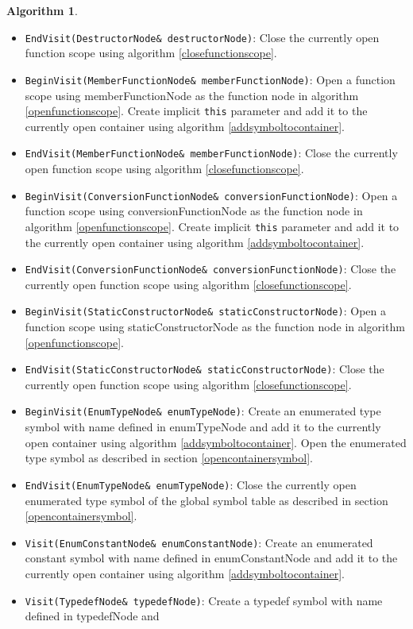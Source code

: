 \documentclass[a4paper,oneside,11pt]{book}
\theoremstyle{definition}
\newtheorem{algo}{Algorithm}[section]
\begin{document}
\begin{algo}
\begin{itemize}
\item
\verb|EndVisit(DestructorNode& destructorNode)|:
Close the currently open function scope using algorithm \ref{closefunctionscope}.
\item
\verb|BeginVisit(MemberFunctionNode& memberFunctionNode)|:
Open a function scope using memberFunctionNode as the function node in algorithm \ref{openfunctionscope}.
Create implicit \verb|this| parameter and add it to the currently open container using algorithm \ref{addsymboltocontainer}.
\item
\verb|EndVisit(MemberFunctionNode& memberFunctionNode)|:
Close the currently open function scope using algorithm \ref{closefunctionscope}.
\item
\verb|BeginVisit(ConversionFunctionNode& conversionFunctionNode)|:
Open a function scope using conversionFunctionNode as the function node in algorithm \ref{openfunctionscope}.
Create implicit \verb|this| parameter and add it to the currently open container using algorithm \ref{addsymboltocontainer}.
\item
\verb|EndVisit(ConversionFunctionNode& conversionFunctionNode)|:
Close the currently open function scope using algorithm \ref{closefunctionscope}.
\item
\verb|BeginVisit(StaticConstructorNode& staticConstructorNode)|:
Open a function scope using staticConstructorNode as the function node in algorithm \ref{openfunctionscope}.
\item
\verb|EndVisit(StaticConstructorNode& staticConstructorNode)|:
Close the currently open function scope using algorithm \ref{closefunctionscope}.
\item
\verb|BeginVisit(EnumTypeNode& enumTypeNode)|:
Create an enumerated type symbol with name defined in enumTypeNode and
add it to the currently open container using algorithm \ref{addsymboltocontainer}.
Open the enumerated type symbol as described in section \ref{opencontainersymbol}.
\item
\verb|EndVisit(EnumTypeNode& enumTypeNode)|:
Close the currently open enumerated type symbol of the global symbol table as described in section \ref{opencontainersymbol}.
\item
\verb|Visit(EnumConstantNode& enumConstantNode)|:
Create an enumerated constant symbol with name defined in enumConstantNode and
add it to the currently open container using algorithm \ref{addsymboltocontainer}.
\item
\verb|Visit(TypedefNode& typedefNode)|:
Create a typedef symbol with name defined in typedefNode and

\end{itemize}
\end{algo}
\end{document}
